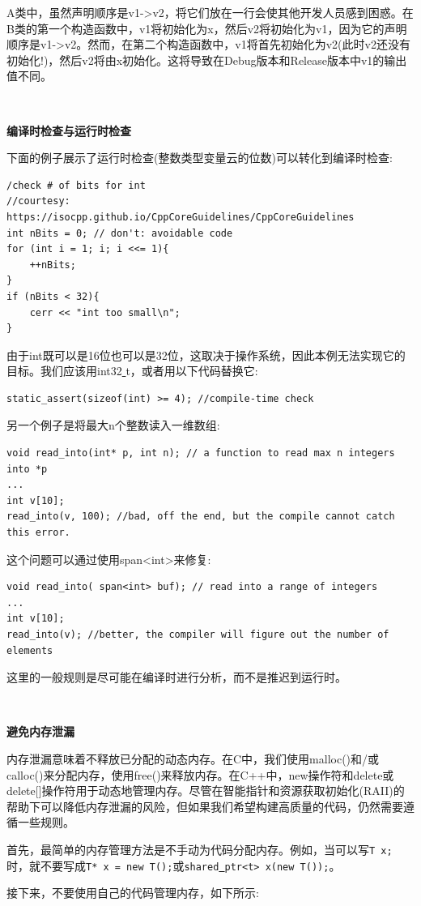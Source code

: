 A类中，虽然声明顺序是v1->v2，将它们放在一行会使其他开发人员感到困惑。在B类的第一个构造函数中，v1将初始化为x，然后v2将初始化为v1，因为它的声明顺序是v1->v2。然而，在第二个构造函数中，v1将首先初始化为v2(此时v2还没有初始化!)，然后v2将由x初始化。这将导致在Debug版本和Release版本中v1的输出值不同。 \par

\noindent\textbf{}\ \par
\textbf{编译时检查与运行时检查} \ \par
下面的例子展示了运行时检查(整数类型变量云的位数)可以转化到编译时检查: \par

\begin{lstlisting}[caption={}]
/check # of bits for int
//courtesy: https://isocpp.github.io/CppCoreGuidelines/CppCoreGuidelines
int nBits = 0; // don't: avoidable code
for (int i = 1; i; i <<= 1){
	++nBits;
}
if (nBits < 32){
	cerr << "int too small\n";
}
\end{lstlisting}

由于int既可以是16位也可以是32位，这取决于操作系统，因此本例无法实现它的目标。我们应该用int32\underline{ }t，或者用以下代码替换它: \par

\begin{lstlisting}[caption={}]
static_assert(sizeof(int) >= 4); //compile-time check
\end{lstlisting}

另一个例子是将最大n个整数读入一维数组: \par

\begin{lstlisting}[caption={}]
void read_into(int* p, int n); // a function to read max n integers into *p
...
int v[10];
read_into(v, 100); //bad, off the end, but the compile cannot catch this error.
\end{lstlisting}

这个问题可以通过使用span<int>来修复: \par

\begin{lstlisting}[caption={}]
void read_into( span<int> buf); // read into a range of integers
...
int v[10];
read_into(v); //better, the compiler will figure out the number of elements
\end{lstlisting}

这里的一般规则是尽可能在编译时进行分析，而不是推迟到运行时。 \par

\noindent\textbf{}\ \par
\textbf{避免内存泄漏} \ \par
内存泄漏意味着不释放已分配的动态内存。在C中，我们使用malloc()和/或calloc()来分配内存，使用free()来释放内存。在C++中，new操作符和delete或delete[]操作符用于动态地管理内存。尽管在智能指针和资源获取初始化(RAII)的帮助下可以降低内存泄漏的风险，但如果我们希望构建高质量的代码，仍然需要遵循一些规则。\par
首先，最简单的内存管理方法是不手动为代码分配内存。例如，当可以写\texttt{T x;}时，就不要写成\texttt{T* x = new T();}或\texttt{shared\underline{ }ptr<t> x(new T());}。 \par
接下来，不要使用自己的代码管理内存，如下所示: \par

